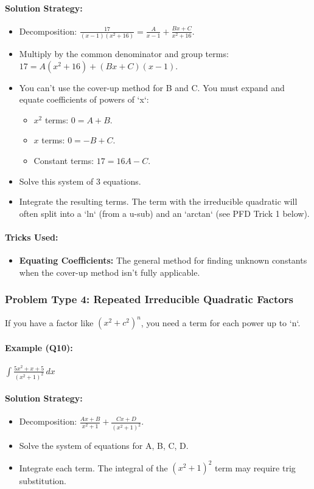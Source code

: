 \documentclass{article}
\begin{document}
\paragraph{Solution Strategy:}
\begin{itemize}
    \item Decomposition: $\frac{17}{(x-1)(x^2+16)} = \frac{A}{x-1} + \frac{Bx+C}{x^2+16}$.
    \item Multiply by the common denominator and group terms: $17 = A(x^2+16) + (Bx+C)(x-1)$.
    \item You can't use the cover-up method for B and C. You must expand and equate coefficients of powers of `x`:
    \begin{itemize}
        \item $x^2$ terms: $0 = A+B$.
        \item $x$ terms: $0 = -B+C$.
        \item Constant terms: $17 = 16A-C$.
    \end{itemize}
    \item Solve this system of 3 equations.
    \item Integrate the resulting terms. The term with the irreducible quadratic will often split into a `ln` (from a u-sub) and an `arctan` (see PFD Trick 1 below).
\end{itemize}
\paragraph{Tricks Used:}
\begin{itemize}
    \item \textbf{Equating Coefficients:} The general method for finding unknown constants when the cover-up method isn't fully applicable.
\end{itemize}

\subsubsection{Problem Type 4: Repeated Irreducible Quadratic Factors}
If you have a factor like $(x^2+c^2)^n$, you need a term for each power up to `n`.
\paragraph{Example (Q10):} $ \int \frac{5x^2+x+5}{(x^2+1)^2} \,dx $
\paragraph{Solution Strategy:}
\begin{itemize}
    \item Decomposition: $\frac{Ax+B}{x^2+1} + \frac{Cx+D}{(x^2+1)^2}$.
    \item Solve the system of equations for A, B, C, D.
    \item Integrate each term. The integral of the $(x^2+1)^2$ term may require trig substitution.
\end{itemize}
\end{document}
